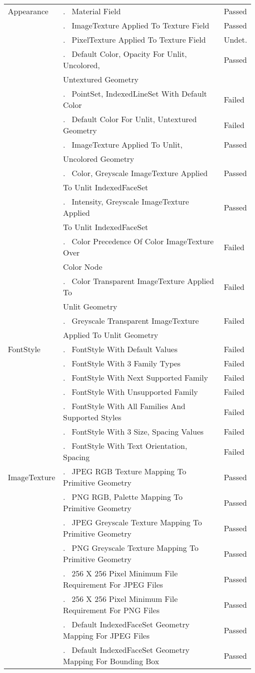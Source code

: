 \documentclass[12pt,letterpaper]{article}
\newcounter{testCaseCtr}
\newcommand{\testCase}{\arabic{testCaseCtr}.~ \stepcounter{testCaseCtr}}
\newcommand{\resetTestCase}{\setcounter{testCaseCtr}{1}}
\newcommand{\AppA}{Material Field}
\newcommand{\AppB}{ImageTexture Applied To Texture Field}
\newcommand{\AppC}{PixelTexture Applied To Texture Field}
\newcommand{\AppDa}{Default Color, Opacity For Unlit, Uncolored,~}
\newcommand{\AppDb}{Untextured Geometry}
\newcommand{\AppE}{PointSet, IndexedLineSet With Default Color}
\newcommand{\AppF}{Default Color For Unlit, Untextured Geometry}
\newcommand{\AppGa}{ImageTexture Applied To Unlit,~}
\newcommand{\AppGb}{Uncolored Geometry}
\newcommand{\AppHa}{Color, Greyscale ImageTexture Applied~}
\newcommand{\AppHb}{To Unlit IndexedFaceSet}
\newcommand{\AppIa}{Intensity, Greyscale ImageTexture Applied~}
\newcommand{\AppIb}{To Unlit IndexedFaceSet}
\newcommand{\AppJa}{Color Precedence Of Color ImageTexture Over~}
\newcommand{\AppJb}{Color Node}
\newcommand{\AppKa}{Color Transparent ImageTexture Applied To~}
\newcommand{\AppKb}{Unlit Geometry}
\newcommand{\AppLa}{Greyscale Transparent ImageTexture~}
\newcommand{\AppLb}{Applied To Unlit Geometry}
\newcommand{\FSA}{FontStyle With Default Values}
\newcommand{\FSB}{FontStyle With 3 Family Types}
\newcommand{\FSC}{FontStyle With Next Supported Family}
\newcommand{\FSD}{FontStyle With Unsupported Family}
\newcommand{\FSE}{FontStyle With All Families And Supported Styles}
\newcommand{\FSF}{FontStyle With 3 Size, Spacing Values}
\newcommand{\FSG}{FontStyle With Text Orientation, Spacing}
\newcommand{\ITA}{JPEG RGB Texture Mapping To Primitive Geometry}
\newcommand{\ITB}{PNG RGB, Palette Mapping To Primitive Geometry}
\newcommand{\ITC}{JPEG Greyscale Texture Mapping To Primitive Geometry}
\newcommand{\ITD}{PNG Greyscale Texture Mapping To Primitive Geometry}
\newcommand{\ITE}{256 X 256 Pixel Minimum File Requirement For JPEG Files}
\newcommand{\ITF}{256 X 256 Pixel Minimum File Requirement For PNG Files}
\newcommand{\ITG}{Default IndexedFaceSet Geometry Mapping For JPEG Files}
\newcommand{\ITHa}{Default IndexedFaceSet Geometry Mapping For Bounding Box~}
\begin{document}
\begin{center}
\begin{longtable}{|l|l|l|}
Appearance & \testCase \AppA & Passed \\\cline{2-3}
 & \testCase \AppB & Passed \\\cline{2-3}
 & \testCase \AppC & Undet. \\\cline{2-3}
 & \testCase \AppDa & Passed \\
 & \AppDb & \\\cline{2-3}
 & \testCase \AppE & Failed \\\cline{2-3}
 & \testCase \AppF & Failed \\\cline{2-3}
 & \testCase \AppGa & Passed \\
 & \AppGb & \\\cline{2-3}
 & \testCase \AppHa & Passed \\
 & \AppHb & \\\cline{2-3}
 & \testCase \AppIa & Passed \\
 & \AppIb & \\\cline{2-3}
 & \testCase \AppJa & Failed \\
 & \AppJb & \\\cline{2-3}
 & \testCase \AppKa & Failed \\
 & \AppKb & \\\cline{2-3}
 & \testCase \AppLa & Failed \\
 & \AppLb & \\\hline
\resetTestCase
FontStyle & \testCase \FSA & Failed \\\cline{2-3}
 & \testCase \FSB & Failed \\\cline{2-3}
 & \testCase \FSC & Failed \\\cline{2-3}
 & \testCase \FSD & Failed \\\cline{2-3}
 & \testCase \FSE & Failed \\\cline{2-3}
 & \testCase \FSF & Failed \\\cline{2-3}
 & \testCase \FSG & Failed \\\hline
\resetTestCase
ImageTexture & \testCase \ITA & Passed \\\cline{2-3}
 & \testCase \ITB & Passed \\\cline{2-3}
 & \testCase \ITC & Passed \\\cline{2-3}
 & \testCase \ITD & Passed \\\cline{2-3}
 & \testCase \ITE & Passed \\\cline{2-3}
 & \testCase \ITF & Passed \\\cline{2-3}
 & \testCase \ITG & Passed \\\cline{2-3}
 & \testCase \ITHa & Passed \\

\end{longtable}
\end{center}
\end{document}
